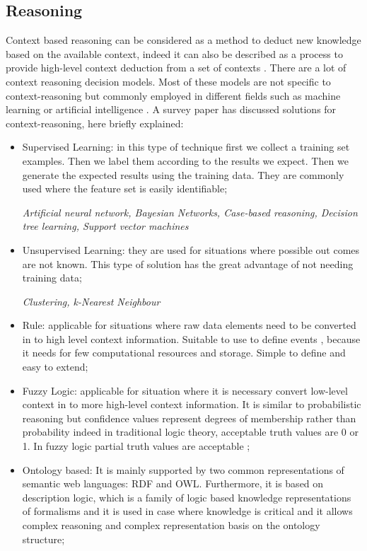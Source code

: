 \documentclass{thesisreport}
\begin{document}
 \subsection{Reasoning}
 Context based reasoning can be considered as a method to deduct new knowledge based on the available context, indeed it can also be described as a process to provide high-level context deduction from a set of contexts \cite{perera2014context}.
 There are a lot of context reasoning decision models. Most of these models are not specific to context-reasoning but commonly employed in different fields such as machine learning or artificial intelligence \cite{perera2014context}.
 A survey paper \cite{perera2014context} has discussed solutions for context-reasoning, here briefly explained: 
 \begin{itemize}
     \item Supervised Learning: in this type of technique first we collect a training set examples. Then we label them according to the results we expect. Then we generate the expected results using the training data.
     They are commonly used where the feature set is easily identifiable;
     
     \textit{Artificial neural network, Bayesian Networks, Case-based reasoning, Decision tree learning, Support vector machines}
     \item Unsupervised Learning: they are used for situations where possible out comes are not known. This type of solution has the great advantage of not needing training data;
     
     \textit{Clustering, k-Nearest Neighbour}
     \item Rule: applicable for situations where raw data elements need to be converted in to high level context information. Suitable to use to define events , because it needs for few computational resources and storage. Simple to define and easy to extend; 
     \item Fuzzy Logic: applicable for situation where it is necessary convert low-level context in to more high-level context information. It is similar to probabilistic reasoning but confidence values represent degrees of membership rather than probability indeed in traditional logic theory, acceptable truth values are 0 or 1. In fuzzy logic partial truth values are acceptable \cite{perera2014context}; 
     \item Ontology based: It is mainly supported by two common representations of semantic web languages: RDF and OWL. Furthermore, it is based on description logic, which is a family of logic based knowledge representations of formalisms and it is used in case where knowledge is critical and it allows complex reasoning and complex representation basis on the ontology structure;
    

\end{itemize}
\end{document}
